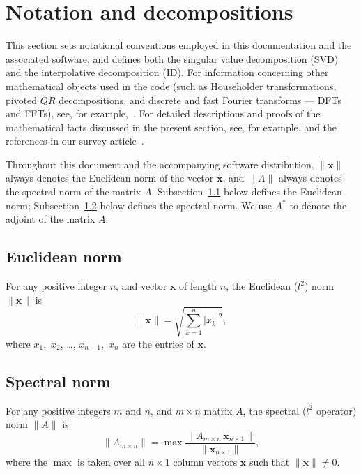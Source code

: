 \documentclass[letterpaper,12pt]{article}
\def\x{\mathbf{x}}
\begin{document}
\section{Notation and decompositions}
\label{defs}

This section sets notational conventions employed
in this documentation and the associated software,
and defines both the singular value decomposition (SVD)
and the interpolative decomposition (ID).
For information concerning other mathematical objects
used in the code (such as Householder transformations,
pivoted $QR$ decompositions, and discrete and fast Fourier transforms
--- DFTs and FFTs), see, for example,~\cite{golub-van_loan}.
For detailed descriptions and proofs of the mathematical facts
discussed in the present section, see, for example,
\cite{golub-van_loan} and the references
in our survey article~\cite{liberty-woolfe-martinsson-rokhlin-tygert}.

Throughout this document and the accompanying software distribution,
$\| \x \|$ always denotes the Euclidean norm of the vector $\x$,
and $\| A \|$ always denotes the spectral norm of the matrix $A$.
Subsection~\ref{Euclidean} below defines the Euclidean norm;
Subsection~\ref{spectral} below defines the spectral norm.
We use $A^*$ to denote the adjoint of the matrix $A$.


\subsection{Euclidean norm}
\label{Euclidean}

For any positive integer $n$, and vector $\x$ of length $n$,
the Euclidean ($l^2$) norm $\| \x \|$ is
%
\begin{equation}
\| \x \| = \sqrt{ \sum_{k=1}^n |x_k|^2 },
\end{equation}
%
where $x_1$,~$x_2$, \dots, $x_{n-1}$,~$x_n$ are the entries of $\x$.


\subsection{Spectral norm}
\label{spectral}

For any positive integers $m$ and $n$, and $m \times n$ matrix $A$,
the spectral ($l^2$ operator) norm $\| A \|$ is
%
\begin{equation}
\| A_{m \times n} \|
= \max \frac{\| A_{m \times n} \, \x_{n \times 1} \|}
            {\| \x_{n \times 1} \|},
\end{equation}
%
where the $\max$ is taken over all $n \times 1$ column vectors $\x$
such that $\| \x \| \ne 0$.
\end{document}

